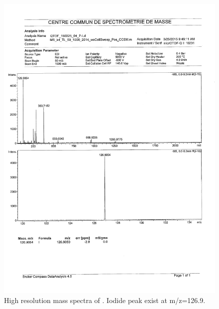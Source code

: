 \documentclass[journal=jacsat,manuscript=article]{achemso}
\begin{document}
\begin{figure}
\includegraphics[height=\textheight-2\baselineskip]{mass_PImI.png}
\caption{High resolution mass spectra of . Iodide peak exist at m/z=126.9.}
\end{figure}
\end{document}

